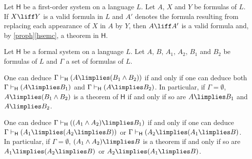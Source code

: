 \begin{lemma}
Let $\mathsf{H}$ be a first-order system on a language $L$. Let $A$, $X$ and $Y$ be formulas of $L$. If $X\liff Y$ is a valid formula in $L$ and $A'$ denotes the formula resulting from replacing each appearance of $X$ in $A$ by $Y$, then $A\liff A'$ is a valid formula and, by \ref{proph}\ref{hsemc}, a theorem in $\mathsf{H}$.
\end{lemma}



\begin{proposition}
Let $\mathsf{H}$ be a formal system on a language $L$. Let $A$, $B$, $A_1$, $A_2$, $B_1$ and $B_2$ be formulas of $L$ and $\Gamma$ a set of formulas of $L$.
\begin{statements}
\item One can deduce $\Gamma \vdash_\mathsf{H} (A \limplies (B_1\land B_2))$ if and only if one can deduce both $\Gamma \vdash_\mathsf{H} (A\limplies B_1)$ and $\Gamma \vdash_\mathsf{H} (A\limplies B_2)$. In particular, if $\Gamma = \emptyset$, $A\limplies (B_1\land B_2)$ is a theorem of $\mathsf{H}$ if and only if so are $A\limplies B_1$ and $A \limplies B_2$.

\item One can deduce $\Gamma \vdash_\mathsf{H} ( (A_1\land A_2) \limplies B_1 )$ if and only if one can deduce $\Gamma \vdash_\mathsf{H} (A_1 \limplies (A_2 \limplies B))$ or $\Gamma \vdash_\mathsf{H} (A_2 \limplies (A_1 \limplies B)$. In particular, if $\Gamma = \emptyset$, $(A_1\land A_2) \limplies B$ is a theorem if and only if so are $A_1\limplies (A_2\limplies B)$ or $A_2 \limplies (A_1 \limplies B)$.
\end{statements}
\label{implesmani}
\end{proposition}


